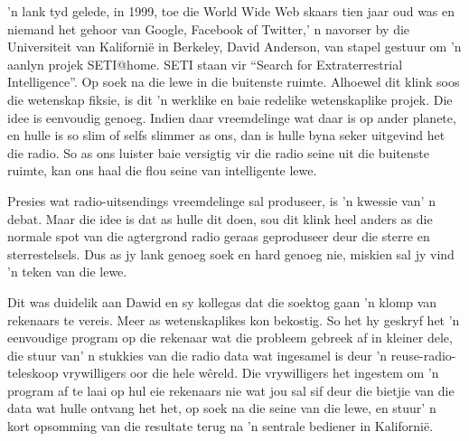 % 
% 
% 
'n lank tyd gelede, in 1999, toe die World Wide Web skaars tien jaar oud was en niemand het gehoor van Google, Facebook of Twitter,' n navorser by die Universiteit van Kalifornië in Berkeley, David Anderson, van stapel gestuur om 'n aanlyn projek SETI@home. SETI staan vir “Search for Extraterrestrial Intelligence”. Op soek na die lewe in die buitenste ruimte. 
Alhoewel dit klink soos die wetenskap fiksie, is dit 'n werklike en baie redelike wetenskaplike projek. Die idee is eenvoudig genoeg. Indien daar vreemdelinge wat daar is op ander planete, en hulle is so slim of selfs slimmer as ons, dan is hulle byna seker uitgevind het die radio. So as ons luister baie versigtig vir die radio seine uit die buitenste ruimte, kan ons haal die flou seine van intelligente lewe. \par
Presies wat radio-uitsendings vreemdelinge sal produseer, is 'n kwessie van' n debat. Maar die idee is dat as hulle dit doen, sou dit klink heel anders as die normale spot van die agtergrond radio geraas geproduseer deur die sterre en sterrestelsels. Dus as jy lank genoeg soek en hard genoeg nie, miskien sal jy vind 'n teken van die lewe. \par
Dit was duidelik aan Dawid en sy kollegas dat die soektog gaan 'n klomp van rekenaars te vereis. Meer as wetenskaplikes kon bekostig. So het hy geskryf het 'n eenvoudige program op die rekenaar wat die probleem gebreek af in kleiner dele, die stuur van' n stukkies van die radio data wat ingesamel is deur 'n reuse-radio-teleskoop vrywilligers oor die hele wêreld. Die vrywilligers het ingestem om 'n program af te laai op hul eie rekenaars nie wat jou sal sif deur die bietjie van die data wat hulle ontvang het het, op soek na die seine van die lewe, en stuur' n kort opsomming van die resultate terug na 'n sentrale bediener in Kalifornië. \par
